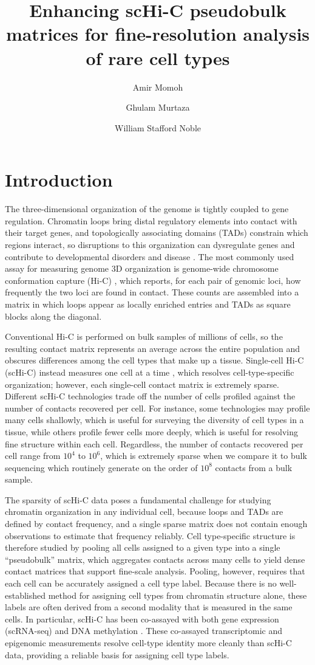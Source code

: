 \documentclass{article}
\title{Enhancing scHi-C pseudobulk matrices for fine-resolution analysis of rare cell types}
\author[1]{Amir Momoh}
\author[1]{Ghulam Murtaza}
\author[1,2]{William Stafford Noble}
\affil[1]{Department of Genome Sciences, University of Washington}
\affil[2]{Paul G.\ Allen School of Computer Science and Engineering, University of Washington}
\date{}
\begin{document}
\maketitle

\section{Introduction}

The three-dimensional organization of the genome is tightly coupled to gene regulation.
Chromatin loops bring distal regulatory elements into contact with their target genes, and topologically associating domains (TADs) constrain which regions interact, so disruptions to this organization can dysregulate genes and contribute to developmental disorders and disease \cite{}.
The most commonly used assay for measuring genome 3D organization is genome-wide chromosome conformation capture (Hi-C) \cite{}, which reports, for each pair of genomic loci, how frequently the two loci are found in contact.
These counts are assembled into a matrix in which loops appear as locally enriched entries and TADs as square blocks along the diagonal.

Conventional Hi-C is performed on bulk samples of millions of cells, so the resulting contact matrix represents an average across the entire population and obscures differences among the cell types that make up a tissue.
Single-cell Hi-C (scHi-C) instead measures one cell at a time \cite{}, which resolves cell-type-specific organization; however, each single-cell contact matrix is extremely sparse.
Different scHi-C technologies trade off the number of cells profiled against the number of contacts recovered per cell. 
For instance, some technologies \cite{} may profile many cells shallowly, which is useful for surveying the diversity of cell types in a tissue, while others profile fewer cells more deeply, which is useful for resolving fine structure within each cell. 
Regardless, the number of contacts recovered per cell range from $10^4$ to $10^6$, which is extremely sparse when we compare it to bulk sequencing which routinely generate on the order of $10^8$ contacts from a bulk sample.

The sparsity of scHi-C data poses a fundamental challenge for studying chromatin organization in any individual cell, because loops and TADs are defined by contact frequency, and a single sparse matrix does not contain enough observations to estimate that frequency reliably.
Cell type-specific structure is therefore studied by pooling all cells assigned to a given type into a single ``pseudobulk'' matrix, which aggregates contacts across many cells to yield dense contact matrices that support fine-scale analysis.
Pooling, however, requires that each cell can be accurately assigned a cell type label.
Because there is no well-established method for assigning cell types from chromatin structure alone, these labels are often derived from a second modality that is measured in the same cells.
In particular, scHi-C has been co-assayed with both gene expression (scRNA-seq) \cite{} and DNA methylation \cite{}. 
These co-assayed transcriptomic and epigenomic measurements resolve cell-type identity more cleanly than scHi-C data, providing a reliable basis for assigning cell type labels.
\end{document}

